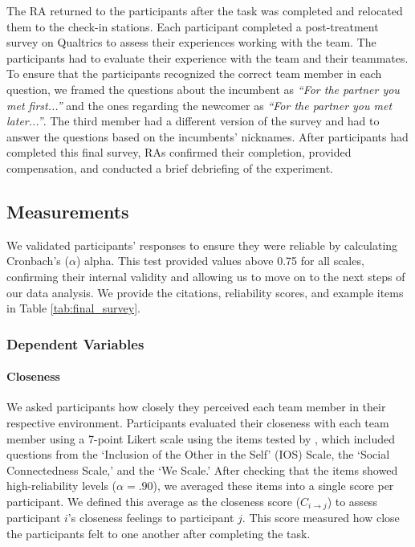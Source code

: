 The RA returned to the participants after the task was completed and relocated them to the check-in stations. Each participant completed a post-treatment survey on Qualtrics to assess their experiences working with the team. The participants had to evaluate their experience with the team and their teammates. To ensure that the participants recognized the correct team member in each question, we framed the questions about the incumbent as \textit{``For the partner you met first...''} and the ones regarding the newcomer as \textit{``For the partner you met later...''}. The third member had a different version of the survey and had to answer the questions based on the incumbents' nicknames. After participants had completed this final survey, RAs confirmed their completion, provided compensation, and conducted a brief debriefing of the experiment.

\subsection{Measurements}
We validated participants' responses to ensure they were reliable by calculating Cronbach's ($\alpha$) alpha. This test provided values above 0.75 for all scales, confirming their internal validity and allowing us to move on to the next steps of our data analysis. We provide the citations, reliability scores, and example items in Table \ref{tab:final_survey}.

\subsubsection{Dependent Variables}
\paragraph{Closeness}
We asked participants how closely they perceived each team member in their respective environment. Participants evaluated their closeness with each team member using a 7-point Likert scale using the items tested by \cite{Gachter2015}, which included questions from the `Inclusion of the Other in the Self' (IOS) Scale, the `Social Connectedness Scale,' and the `We Scale.' After checking that the items showed high-reliability levels ($\alpha=.90$), we averaged these items into a single score per participant. We defined this average as the closeness score ($C_{i \rightarrow j}$) to assess participant $i$'s closeness feelings to participant $j$. This score measured how close the participants felt to one another after completing the task.

